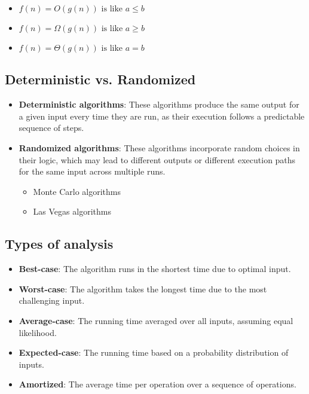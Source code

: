     \begin{intuition}
        \begin{itemize}
            \item $f(n) = O(g(n)) \text{ is like } a \leq b$
            \item $f(n) = \Omega(g(n)) \text{ is like } a \geq b$
            \item $f(n) = \Theta(g(n)) \text{ is like } a = b$
        \end{itemize}
    \end{intuition}

\subsection{Deterministic vs. Randomized}
\begin{definition}
    \begin{itemize}
        \item \textbf{Deterministic algorithms}: These algorithms produce the same output for a given input every time they are run, as their execution follows a predictable sequence of steps.
        \item \textbf{Randomized algorithms}: These algorithms incorporate random choices in their logic, which may lead to different outputs or different execution paths for the same input across multiple runs.
        \begin{itemize}
            \item Monte Carlo algorithms
            \item Las Vegas algorithms
        \end{itemize}
    \end{itemize}
\end{definition}

\subsection{Types of analysis}
\begin{definition}
    \begin{itemize}
        \item \textbf{Best-case}: The algorithm runs in the shortest time due to optimal input.
        \item \textbf{Worst-case}: The algorithm takes the longest time due to the most challenging input.
        \item \textbf{Average-case}: The running time averaged over all inputs, assuming equal likelihood.
        \item \textbf{Expected-case}: The running time based on a probability distribution of inputs.
        \item \textbf{Amortized}: The average time per operation over a sequence of operations.
    \end{itemize}
\end{definition}

